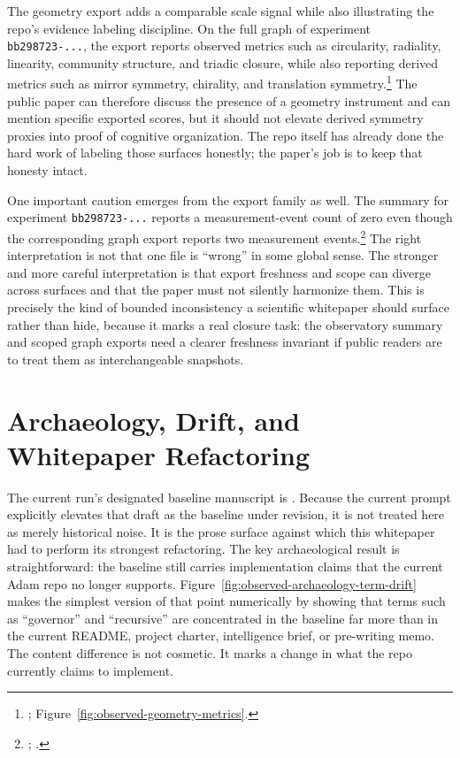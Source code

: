 \documentclass[10pt]{article}
\begin{document}
The geometry export adds a comparable scale signal while also illustrating the repo's evidence labeling discipline. On the full graph of experiment \texttt{bb298723-...}, the export reports observed metrics such as circularity, radiality, linearity, community structure, and triadic closure, while also reporting derived metrics such as mirror symmetry, chirality, and translation symmetry.\footnote{; Figure~\ref{fig:observed-geometry-metrics}.} The public paper can therefore discuss the presence of a geometry instrument and can mention specific exported scores, but it should not elevate derived symmetry proxies into proof of cognitive organization. The repo itself has already done the hard work of labeling those surfaces honestly; the paper's job is to keep that honesty intact.

One important caution emerges from the export family as well. The  summary for experiment \texttt{bb298723-...} reports a measurement-event count of zero even though the corresponding graph export reports two measurement events.\footnote{; .} The right interpretation is not that one file is ``wrong'' in some global sense. The stronger and more careful interpretation is that export freshness and scope can diverge across surfaces and that the paper must not silently harmonize them. This is precisely the kind of bounded inconsistency a scientific whitepaper should surface rather than hide, because it marks a real closure task: the observatory summary and scoped graph exports need a clearer freshness invariant if public readers are to treat them as interchangeable snapshots.

\section{Archaeology, Drift, and Whitepaper Refactoring}

The current run's designated baseline manuscript is . Because the current prompt explicitly elevates that draft as the baseline under revision, it is not treated here as merely historical noise. It is the prose surface against which this whitepaper had to perform its strongest refactoring. The key archaeological result is straightforward: the baseline still carries implementation claims that the current Adam repo no longer supports. Figure~\ref{fig:observed-archaeology-term-drift} makes the simplest version of that point numerically by showing that terms such as ``governor'' and ``recursive'' are concentrated in the baseline far more than in the current README, project charter, intelligence brief, or pre-writing memo. The content difference is not cosmetic. It marks a change in what the repo currently claims to implement.
\end{document}
